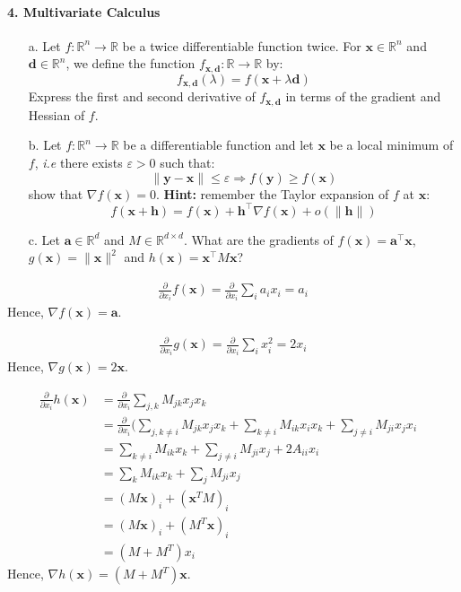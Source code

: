 \documentclass[11pt]{article}
\newcommand{\eps}{\varepsilon}
\newcommand{\R}{\mathbb{R}}                     %
\newcommand{\bx}{\mathbf{x}}
\newcommand{\bd}{\mathbf{d}}
\newcommand{\by}{\mathbf{y}}
\newcommand{\bh}{\mathbf{h}}
\newcommand{\ba}{\mathbf{a}}
\begin{document}
\paragraph{4. Multivariate Calculus}

\begin{itemize}
    \item[a.] Let $f:\R^n\to\R$ be a twice differentiable function twice. For
$\bx\in\R^n$ and $\bd\in\R^n$, we define the function $f_{\bx, \bd}:\R\to\R$ by:
\begin{displaymath}
    f_{\bx,\bd}(\lambda) = f(\bx+\lambda \bd)
\end{displaymath}
Express the first and second derivative of $f_{\bx,\bd}$ in terms of the
gradient and Hessian of $f$. 

\color{blue}
\color{black}


\item[b.] Let $f:\R^n\to\R$ be a differentiable function and let $\bx$ be
a local minimum of $f$, \emph{i.e} there exists $\eps>0$ such that:
\begin{displaymath}
    \|\by-\bx\| \leq \eps \Rightarrow f(\by) \geq f(\bx)
\end{displaymath}
show that $\nabla f(\bx) = 0$. \textbf{Hint:} remember the Taylor expansion of
$f$ at $\bx$:
\begin{displaymath}
    f(\bx+\bh) = f(\bx) + \bh^\intercal\nabla f(\bx) + o(\|\bh\|)
\end{displaymath}

\color{blue}
\color{black}


\item[c.] Let $\ba\in\R^d$ and $M\in\R^{d\times d}$. What are the gradients
of $f(\bx) = \ba^\intercal \bx$, $g(\bx) = \|\bx\|^2$ and $h(\bx)
= \bx^\intercal M\bx$?
\end{itemize}

\color{blue}
\begin{align*}
\frac{\partial}{\partial x_i}f(\bx)=\frac{\partial}{\partial x_i}\sum_i a_ix_i=a_i
\end{align*}
Hence, $\nabla f(\bx)=\ba$.

\begin{align*}
\frac{\partial}{\partial x_i}g(\bx)=\frac{\partial}{\partial x_i}\sum_i x_i^2=2x_i
\end{align*}
Hence, $\nabla g(\bx)=2\bx$.

\begin{align*}
\frac{\partial}{\partial x_i}h(\bx)&=\frac{\partial}{\partial x_i}\sum_{j,k} M_{jk}x_jx_k &\\
&= \frac{\partial}{\partial x_i}(\sum_{j,k\neq i} M_{jk}x_jx_k + \sum_{k\neq i} M_{ik}x_ix_k + \sum_{j\neq i} M_{ji}x_jx_i &\\
&= \sum_{k\neq i}M_{ik}x_k + \sum_{j\neq i}M_{ji}x_j + 2A_{ii}x_i &\\
&= \sum_k M_{ik}x_k + \sum_j M_{ji}x_j &\\
&= (M\bx)_i+(\bx^TM)_i &\\
&= (M\bx)_i+(M^T\bx)_i &\\
&= (M+M^T)x_i
\end{align*}
Hence, $\nabla h(\bx)=(M+M^T)\bx$.
\color{black}
\end{document}
